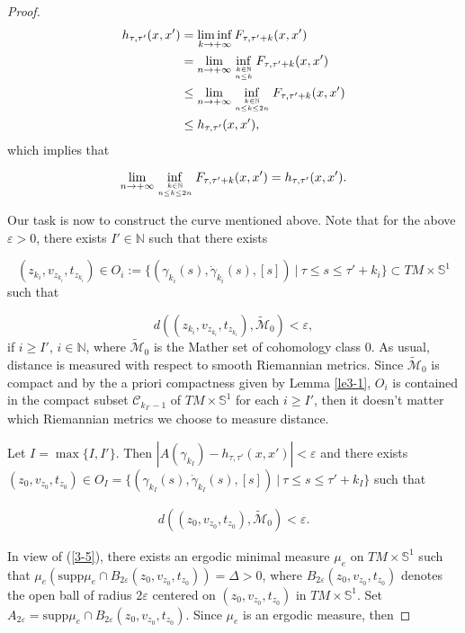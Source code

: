 \documentclass{amsart}[12pt]
\theoremstyle{definition}
\theoremstyle{remark}
\numberwithin{equation}{section}
\begin{document}
\begin{proof}
\begin{align*}
h_{\tau,\tau'}(x,x')& = \liminf_{k\to+\infty}F_{\tau,\tau'+k}(x,x')\\
                    & = \lim_{n\to+\infty}\inf_{k\in\mathbb{N} \atop n\leq
                      k}F_{\tau,\tau'+k}(x,x')\\
                    & \leq \lim_{n\to+\infty}\inf_{k\in\mathbb{N}
                    \atop n\leq k\leq 2n}F_{\tau,\tau'+k}(x,x')\\
                    & \leq h_{\tau,\tau'}(x,x'),
\end{align*}
which implies that

\[
\lim_{n\to+\infty}\inf_{k\in\mathbb{N} \atop n\leq k\leq
2n}F_{\tau,\tau'+k}(x,x')=h_{\tau,\tau'}(x,x').
\]

Our task is now to construct the curve mentioned above. Note that
for the above $\varepsilon>0$, there exists $I'\in\mathbb{N}$ such
that there exists

\[
(z_{k_i},v_{z_{k_i}},t_{z_{k_i}})\in
O_i:=\{(\gamma_{k_i}(s),\dot{\gamma}_{k_i}(s),[s])\ |\ \tau\leq
s\leq\tau'+k_i\}\subset TM\times\mathbb{S}^1
\]
such that

\[
d((z_{k_i},v_{z_{k_i}},t_{z_{k_i}}),\tilde{\mathcal{M}}_0)<\varepsilon,
\]
if $i\geq I'$, $i\in\mathbb{N}$, where $\tilde{\mathcal{M}}_0$ is
the Mather set of cohomology class 0. As usual, distance is
measured with respect to smooth Riemannian metrics. Since
$\tilde{\mathcal{M}}_0$ is compact and by the a priori compactness
given by Lemma \ref{le3-1}, $O_i$ is contained in the compact
subset $\mathcal{C}_{k_{I'}-1}$ of $TM\times\mathbb{S}^1$ for each
$i\geq I'$, then it doesn't matter which Riemannian metrics we
choose to measure distance.

Let $I=\max\{I,I'\}$. Then
$|A(\gamma_{k_I})-h_{\tau,\tau'}(x,x')|<\varepsilon$ and there
exists $(z_0,v_{z_0},t_{z_0})\in
O_I=\{(\gamma_{k_I}(s),\dot{\gamma}_{k_I}(s),[s])\ |\ \tau\leq
s\leq\tau'+k_I\}$ such that

\begin{align}\label{3-5}
d((z_0,v_{z_0},t_{z_0}),\tilde{\mathcal{M}}_0)<\varepsilon.
\end{align}

In view of (\ref{3-5}), there exists an ergodic minimal measure
$\mu_e$ on $TM\times\mathbb{S}^1$ \cite{Mat91} such that
$\mu_e(\mathrm{supp}\mu_e\cap
B_{2\varepsilon}(z_0,v_{z_0},t_{z_0}))=\Delta>0$, where
$B_{2\varepsilon}(z_0,v_{z_0},t_{z_0})$ denotes the open ball of
radius $2\varepsilon$ centered on $(z_0,v_{z_0},t_{z_0})$ in
$TM\times\mathbb{S}^1$. Set
$A_{2\varepsilon}=\mathrm{supp}\mu_e\cap
B_{2\varepsilon}(z_0,v_{z_0},t_{z_0})$. Since $\mu_e$ is an
ergodic measure, then


\end{proof}
\end{document}
